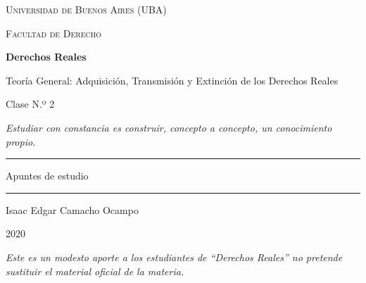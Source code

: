 \documentclass[12pt,oneside]{book}
\newcommand{\universidad}{Universidad de Buenos Aires (UBA)}
\newcommand{\facultad}{Facultad de Derecho}
\newcommand{\materia}{Derechos Reales}
\newcommand{\titulo}{Teoría General: Adquisición, Transmisión y Extinción de los Derechos Reales}
\newcommand{\autor}{Isaac Edgar Camacho Ocampo}
\newcommand{\anio}{2020}
\begin{document}
\begin{titlepage}

\thispagestyle{empty}

\begin{center}

\vspace*{1cm}

{\large \textsc{\universidad}}

\vspace{0.2cm}

{\large \textsc{\facultad}}

\vspace{3cm}

{\Huge \textbf{\materia}}

\vspace{1cm}

{\LARGE \titulo}

\vspace{0.4cm}

{\large Clase N.º 2}

\vspace{0.8cm}

\textit{\small Estudiar con constancia es construir, concepto a concepto, un conocimiento propio.}

\vspace{1.2cm}

\rule{0.70\textwidth}{0.5pt}

\vspace{0.5cm}

{\large Apuntes de estudio}

\vspace{0.5cm}

\rule{0.70\textwidth}{0.5pt}

\vfill

{\large \autor}

\vspace{0.3cm}

{\large \anio}

\end{center}

\vfill

\begin{flushleft}
\textit{Este es un modesto aporte a los estudiantes de ``\materia'' no pretende sustituir el material oficial de la materia.}
\end{flushleft}

\end{titlepage}
\end{document}

